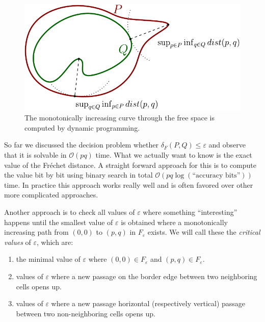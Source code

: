 \documentclass[
oneside,
fontsize=11pt
]{scrartcl}
\begin{document}
\begin{figure}[ht]
  \centering
  \includegraphics[width=\textwidth]{images/hausdorff/hausdorff-distance-example.pdf}
  \caption{The monotonically increasing curve through the free space is computed by dynamic programming.}
  \label{fig_free_space_curve}
\end{figure}

So far we discussed the decision problem whether $\delta_{F}(P,Q) \leq \varepsilon$
and observe that it is solvable in $\mathcal{O}(pq)$ time.
What we actually want to know is the exact value of the Fréchet distance.
A straight forward approach for this is to compute the value bit by bit 
using binary search in total $\mathcal{O}(pq \log (\text{``accuracy bits''}))$ time.
In practice this approach works really well 
and is often favored over other more complicated approaches. \cite{alt_computing_1995} 

Another approach is to check all values of $\varepsilon$ where something ``interesting'' happens
until the smallest value of $\varepsilon$ is obtained where a monotonically increasing path 
from $(0,0)$ to $(p,q)$ in $F_\varepsilon$ exists.
We will call these the \textit{critical values} of $\varepsilon$, which are:
\begin{enumerate}
  \item the minimal value of $\varepsilon$ where $(0,0) \in F_\varepsilon$ and $(p,q) \in F_\varepsilon$.
  \item values of $\varepsilon$ where a new passage on the border edge 
        between two neighboring cells opens up.
  \item values of $\varepsilon$ where a new passage horizontal (respectively vertical) passage 
        between two non-neighboring cells opens up.
\end{enumerate}
\end{document}
